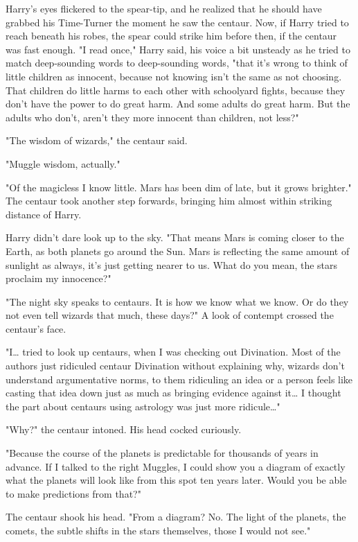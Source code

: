 Harry's eyes flickered to the spear-tip, and he realized that he should have 
grabbed his Time-Turner the moment he saw the centaur. Now, if Harry tried to 
reach beneath his robes, the spear could strike him before then, if the centaur 
was fast enough. "I read once," Harry said, his voice a bit unsteady as he 
tried to match deep-sounding words to deep-sounding words, "that it's wrong to 
think of little children as innocent, because not knowing isn't the same as not 
choosing. That children do little harms to each other with schoolyard fights, 
because they don't have the power to do great harm. And some adults do great 
harm. But the adults who don't, aren't they more innocent than children, not 
less?"

"The wisdom of wizards," the centaur said.

"Muggle wisdom, actually."

"Of the magicless I know little. Mars has been dim of late, but it grows 
brighter." The centaur took another step forwards, bringing him almost within 
striking distance of Harry.

Harry didn't dare look up to the sky. "That means Mars is coming closer to the 
Earth, as both planets go around the Sun. Mars is reflecting the same amount of 
sunlight as always, it's just getting nearer to us. What do you mean, the stars 
proclaim my innocence?"

"The night sky speaks to centaurs. It is how we know what we know. Or do they 
not even tell wizards that much, these days?" A look of contempt crossed the 
centaur's face.

"I{\ldots} tried to look up centaurs, when I was checking out Divination. Most 
of the authors just ridiculed centaur Divination without explaining why, 
wizards don't understand argumentative norms, to them ridiculing an idea or a 
person feels like casting that idea down just as much as bringing evidence 
against it{\ldots} I thought the part about centaurs using astrology was just 
more ridicule{\ldots}"

"Why?" the centaur intoned. His head cocked curiously.

"Because the course of the planets is predictable for thousands of years in 
advance. If I talked to the right Muggles, I could show you a diagram of 
exactly what the planets will look like from this spot ten years later. Would 
you be able to make predictions from that?"

The centaur shook his head. "From a diagram? No. The light of the planets, the 
comets, the subtle shifts in the stars themselves, those I would not see."

